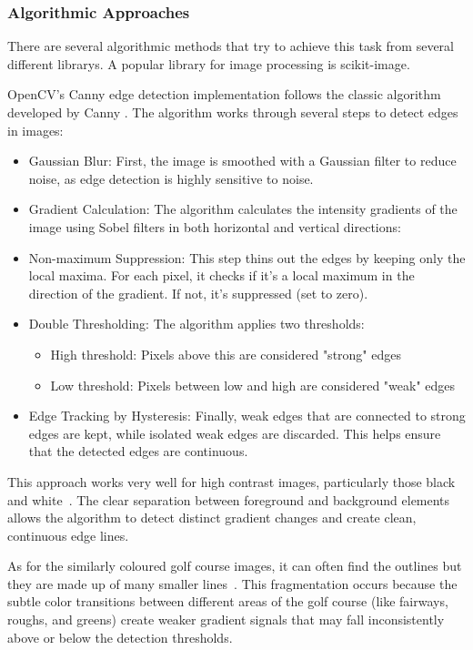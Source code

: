 \documentclass[final]{cmpreport_02}
\begin{document}
\subsubsection{Algorithmic Approaches}
There are several algorithmic methods that try to achieve this task from several different librarys. A popular library for image processing is scikit-image.

OpenCV's Canny edge detection implementation \citep{opencv_library} follows the classic algorithm developed by Canny \citep{canny1986computational}.
The algorithm works through several steps to detect edges in images:
\begin{itemize}
	\item Gaussian Blur: First, the image is smoothed with a Gaussian filter to reduce noise, as edge detection is highly sensitive to noise.
	\item Gradient Calculation: The algorithm calculates the intensity gradients of the image using Sobel filters in both horizontal and vertical directions:
	\item Non-maximum Suppression: This step thins out the edges by keeping only the local maxima. For each pixel, it checks if it's a local maximum in the direction of the gradient. If not, it's suppressed (set to zero).
	\item Double Thresholding: The algorithm applies two thresholds:
	      \begin{itemize}
		      \item High threshold: Pixels above this are considered "strong" edges
		      \item Low threshold: Pixels between low and high are considered "weak" edges
	      \end{itemize}
	\item Edge Tracking by Hysteresis: Finally, weak edges that are connected to strong edges are kept, while isolated weak edges are discarded. This helps ensure that the detected edges are continuous.
\end{itemize}
This approach works very well for high contrast images, particularly those black and white~. The clear separation between foreground and background elements allows the algorithm to detect distinct gradient changes and create clean, continuous edge lines.

As for the similarly coloured golf course images, it can often find the outlines but they are made up of many smaller lines~. This fragmentation occurs because the subtle color transitions between different areas of the golf course (like fairways, roughs, and greens) create weaker gradient signals that may fall inconsistently above or below the detection thresholds.
\end{document}

